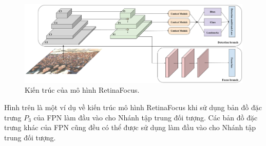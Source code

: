 {    \begin{figure}[H]
        \centering
        \includegraphics[width=13cm] {images/retinafocus_architecture}
        \caption{Kiến trúc của mô hình RetinaFocus.}
        \label{fig:retinafocus_architecture}
    \end{figure}

    \noindent
    Hình trên là một ví dụ về kiến trúc mô hình RetinaFocus khi sử dụng bản đồ đặc trưng $P_3$ của FPN làm đầu vào cho Nhánh tập trung đối tượng.
    Các bản đồ đặc trưng khác của FPN cũng đều có thể được sử dụng làm đầu vào cho Nhánh tập trung đối tượng.
}